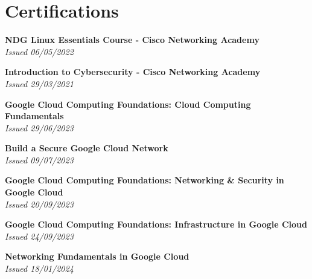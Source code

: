 \documentclass[letterpaper,11pt]{article}
\begin{document}
\section{Certifications}
  \begin{itemize}[leftmargin=0.15in, label={}]
    \small{\item{
     \textbf{NDG Linux Essentials Course - Cisco Networking Academy} \\
     \textit{Issued 06/05/2022} \\
    }}
    \small{\item{
     \textbf{Introduction to Cybersecurity - Cisco Networking Academy} \\
     \textit{Issued 29/03/2021} \\
    }}
    \small{\item{
     \textbf{Google Cloud Computing Foundations: Cloud Computing Fundamentals} \\
     \textit{Issued 29/06/2023} \\
    }}
    \small{\item{
     \textbf{Build a Secure Google Cloud Network} \\
     \textit{Issued 09/07/2023} \\
    }}
    \small{\item{
     \textbf{Google Cloud Computing Foundations: Networking \& Security in Google Cloud} \\
     \textit{Issued 20/09/2023} \\
    }}
    \small{\item{
     \textbf{Google Cloud Computing Foundations: Infrastructure in Google Cloud} \\
     \textit{Issued 24/09/2023} \\
    }}
    \small{\item{
     \textbf{Networking Fundamentals in Google Cloud} \\
     \textit{Issued 18/01/2024} \\
    }}
  \end{itemize}
\end{document}
